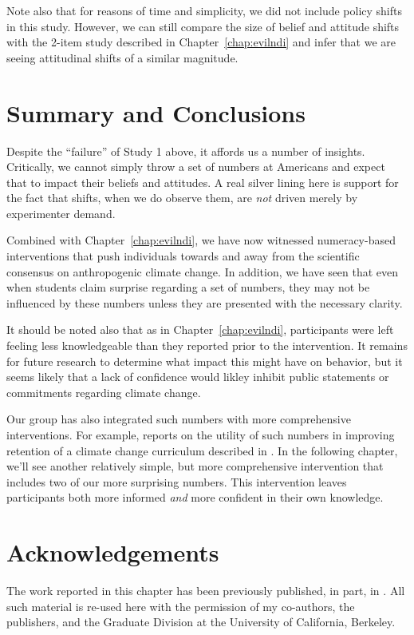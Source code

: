 Note also that for reasons of time and simplicity, we did not include policy
shifts in this study. However, we can still compare the size of belief and
attitude shifts with the 2-item study described in Chapter~\ref{chap:evilndi}
and infer that we are seeing attitudinal shifts of a similar magnitude.

\section{Summary and Conclusions}

Despite the “failure” of Study 1 above, it affords us a number of insights.
Critically, we cannot simply throw a set of numbers at Americans and expect that
to impact their beliefs and attitudes. A real silver lining here is
support for the fact that shifts, when we do observe them, are \emph{not} driven
merely by experimenter demand.

Combined with Chapter~\ref{chap:evilndi}, we have now witnessed numeracy-based
interventions that push individuals towards and away from the scientific
consensus on anthropogenic climate change. In addition, we have seen that even
when students claim surprise regarding a set of numbers, they may not be
influenced by these numbers unless they are presented with the necessary clarity.

It should be noted also that as in Chapter~\ref{chap:evilndi}, participants were
left feeling less knowledgeable than they reported prior to the intervention. It
remains for future research to determine what impact this might have on
behavior, but it seems likely that a lack of confidence would likley
inhibit public statements or commitments regarding climate change.

Our group has also integrated such numbers with  more comprehensive
interventions. For example, \textcite{clark_knowledge_inpress} reports on the
utility of such numbers in improving retention of a climate change curriculum
described in \textcite{felipe_numerical_2012}. In the following chapter, we'll
see another relatively simple, but more comprehensive intervention that includes two
of our more surprising numbers. This intervention leaves participants both more informed
\emph{and} more confident in their own knowledge.

\section*{Acknowledgements}

The work reported in this chapter has been previously published, in part, in
\textcite{clark_knowledge_inpress}.  All such material is re-used here with the
permission of my co-authors, the publishers, and the Graduate Division at the
University of California, Berkeley.
